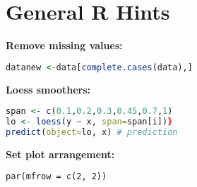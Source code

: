 \section{General R Hints}
\textbf{Remove missing values: }
\begin{lstlisting}[language = R]
datanew <-data[complete.cases(data),]
\end{lstlisting}
\textbf{Loess smoothers: } 
\begin{lstlisting}[language = R]
span <- c(0.1,0.2,0.3,0.45,0.7,1)
lo <- loess(y ~ x, span=span[i])}
predict(object=lo, x) # prediction
\end{lstlisting}
\textbf{Set plot arrangement:}
\begin{lstlisting}
par(mfrow = c(2, 2))
\end{lstlisting}